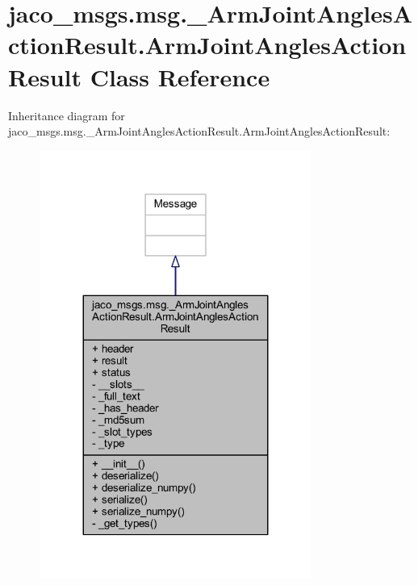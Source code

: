 \hypertarget{classjaco__msgs_1_1msg_1_1__ArmJointAnglesActionResult_1_1ArmJointAnglesActionResult}{}\section{jaco\+\_\+msgs.\+msg.\+\_\+\+Arm\+Joint\+Angles\+Action\+Result.\+Arm\+Joint\+Angles\+Action\+Result Class Reference}
\label{classjaco__msgs_1_1msg_1_1__ArmJointAnglesActionResult_1_1ArmJointAnglesActionResult}


Inheritance diagram for jaco\+\_\+msgs.\+msg.\+\_\+\+Arm\+Joint\+Angles\+Action\+Result.\+Arm\+Joint\+Angles\+Action\+Result\+:
\nopagebreak
\begin{figure}[H]
\begin{center}
\leavevmode
\includegraphics[width=251pt]{d9/dda/classjaco__msgs_1_1msg_1_1__ArmJointAnglesActionResult_1_1ArmJointAnglesActionResult__inherit__graph}
\end{center}
\end{figure}


